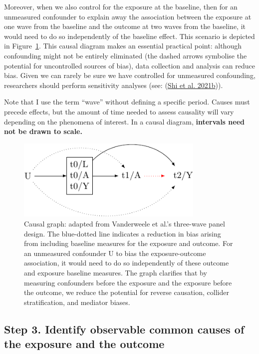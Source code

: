 \documentclass[
  singlecolumn]{report}
\begin{document}
Moreover, when we also control for the exposure at the baseline, then
for an unmeasured confounder to explain away the association between the
exposure at one wave from the baseline and the outcome at two waves from
the baseline, it would need to do so independently of the baseline
effect. This scenario is depicted in Figure~\ref{fig-dag-6}. This causal
diagram makes an essential practical point: although confounding might
not be entirely eliminated (the dashed arrows symbolise the potential
for uncontrolled sources of bias), data collection and analysis can
reduce bias. Given we can rarely be sure we have controlled for
unmeasured confounding, researchers should perform sensitivity analyses
(see: (\protect\hyperlink{ref-shi2021c}{Shi et al. 2021b})).

Note that I use the term ``wave'' without defining a specific period.
Causes must precede effects, but the amount of time needed to assess
causality will vary depending on the phenomena of interest. In a causal
diagram, \textbf{intervals need not be drawn to scale.}

\begin{figure}

{\centering \includegraphics[width=0.8\textwidth,height=\textheight]{causal-dags_files/figure-pdf/fig-dag-6-1.pdf}

}

\caption{\label{fig-dag-6}Causal graph: adapted from Vanderweele et
al.'s three-wave panel design. The blue-dotted line indicates a
reduction in bias arising from including baseline measures for the
exposure and outcome. For an unmeasured confounder U to bias the
exposure-outcome association, it would need to do so independently of
these outcome and exposure baseline measures. The graph clarifies that
by measuring confounders before the exposure and the exposure before the
outcome, we reduce the potential for reverse causation, collider
stratification, and mediator biases.}

\end{figure}

\hypertarget{step-3.-identify-observable-common-causes-of-the-exposure-and-the-outcome}{%
\subsection{Step 3. Identify observable common causes of the exposure
and the
outcome}\label{step-3.-identify-observable-common-causes-of-the-exposure-and-the-outcome}}
\end{document}
